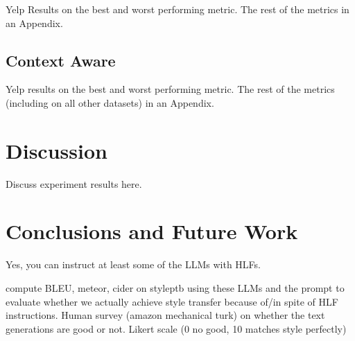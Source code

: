 \documentclass[runningheads,a4paper,11pt]{article}
\begin{document}
Yelp Results on the best and worst performing metric.
The rest of the metrics in an Appendix.

\subsection{Context Aware}

Yelp results on the best and worst performing metric.
The rest of the metrics (including on all other datasets) in an Appendix.

\section{Discussion}

Discuss experiment results here.

\section{Conclusions and Future Work}

Yes, you can instruct at least some of the LLMs with HLFs.

compute BLEU, meteor, cider on styleptb using these LLMs and the prompt to
evaluate whether we actually achieve style transfer because of/in spite of HLF
instructions.
Human survey (amazon mechanical turk) on whether the text generations are good
or not. Likert scale (0 no good, 10 matches style perfectly)



\end{document}
